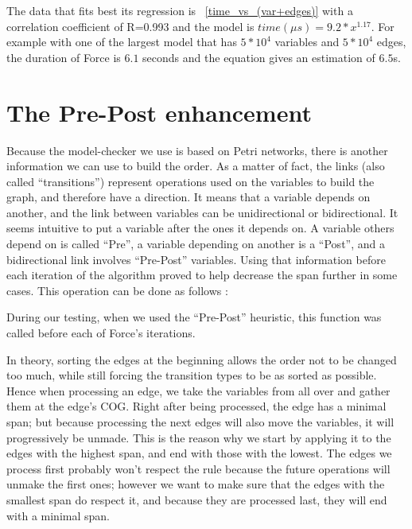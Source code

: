 \documentclass[12pt]{report}
\begin{document}
The data that fits best its regression is ~\ref{time_vs_(var+edges)} with a correlation coefficient of R=0.993 and the model is $time({\mu}s)= {9.2}*x^{1.17}$. For example with one of the largest model that has $5*10^4$ variables and $5*10^4$ edges, the duration of Force is $6.1$ seconds and the equation gives an estimation of $6.5$s.

\newpage
\section{The Pre-Post enhancement} \label{sec:pre_post}

Because the model-checker we use is based on Petri networks, there is another information we can use to build the order. As a matter of fact, the links (also called \enquote{transitions}) represent operations used on the variables to build the graph, and therefore have a direction. It means that a variable depends on another, and the link between variables can be unidirectional or bidirectional. It seems intuitive to put a variable after the ones it depends on. A variable others depend on is called \enquote{Pre}, a variable depending on another is a \enquote{Post}, and a bidirectional link involves \enquote{Pre-Post} variables. Using that information before each iteration of the algorithm proved to help decrease the span further in some cases.
This operation can be done as follows :

\begin{algorithm}
\begin{algorithmic}[1]
  \EndFor
\EndFunction
\label{order-pre-post}
\end{algorithmic}
\end{algorithm}

During our testing, when we used the \enquote{Pre-Post} heuristic, this function was called before each of Force's iterations.

In theory, sorting the edges at the beginning allows the order not to be changed too much, while still forcing the transition types to be as sorted as possible. Hence when processing an edge, we take the variables from all over and gather them at the edge's COG. Right after being processed, the edge has a minimal span; but because processing the next edges will also move the variables, it will progressively be unmade. This is the reason why we start by applying it to the edges with the highest span, and end with those with the lowest. The edges we process first probably won't respect the rule because the future operations will unmake the first ones; however we want to make sure that the edges with the smallest span do respect it, and because they are processed last, they will end with a minimal span.
\end{document}

